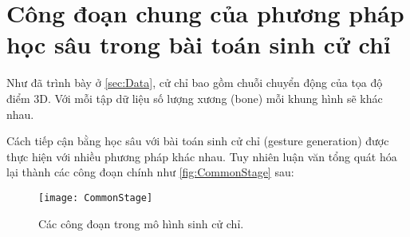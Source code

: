 \section{Công đoạn chung của phương pháp học sâu trong bài toán sinh cử chỉ}
\label{sec:commonstage}

Như đã trình bày ở \autoref{sec:Data}, cử chỉ bao gồm chuỗi chuyển động của tọa độ điểm 3D. Với mỗi tập dữ liệu số lượng xương (bone) mỗi khung hình sẽ khác nhau. 

Cách tiếp cận bằng học sâu với bài toán sinh cử chỉ (gesture generation) được thực hiện với nhiều phương pháp khác nhau. Tuy nhiên luận văn tổng quát hóa lại thành các công đoạn chính như \autoref{fig:CommonStage} sau:

\begin{figure}[H]
	\centering
	\texttt{[image: CommonStage]}
	\caption{Các công đoạn trong mô hình sinh cử chỉ.}
	\label{fig:CommonStage}
\end{figure}

